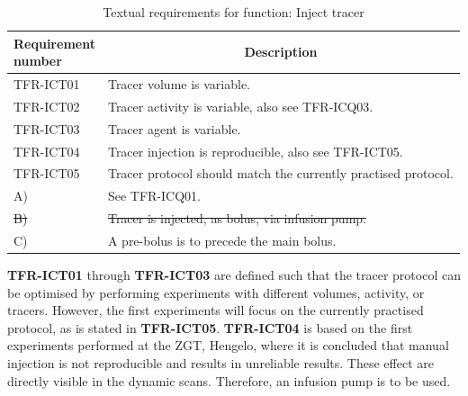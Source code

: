 \begin{table}[H]
\caption{Textual requirements for function: Inject tracer}
\label{tab:injtrac_text}
\begin{tabular}{l|p{115mm}|}
	\makecell[l]{\textbf{Requirement} \\  \textbf{number}} & \multicolumn{1}{c}{\textbf{Description}} \\
	\hline
	TFR-ICT01 			& Tracer volume is variable. \\
	TFR-ICT02			& Tracer activity is variable, also see TFR-ICQ03. \\
	TFR-ICT03			& Tracer agent is variable. \\
	TFR-ICT04 			& Tracer injection is reproducible, also see TFR-ICT05.\\
	TFR-ICT05 			& Tracer protocol should match the currently practised protocol. \\
	\hspace{1.5cm} A) 	& See TFR-ICQ01. \\
	\hspace{1.5cm} \sout{B)} 	& \sout{Tracer is injected, as bolus, via infusion pump.} \\
	\hspace{1.5cm} C) 	& A pre-bolus is to precede the main bolus. \\
	\cline{2-2}
\end{tabular}
\end{table}

\textbf{TFR-ICT01} through \textbf{TFR-ICT03} are defined such that the tracer protocol can be optimised by performing experiments with different volumes, activity, or tracers. However, the first experiments will focus on the currently practised protocol, as is stated in \textbf{TFR-ICT05}. \textbf{TFR-ICT04} is based on the first experiments performed at the ZGT, Hengelo, where it is concluded that manual injection is not reproducible and results in unreliable results. These effect are directly visible in the dynamic scans. Therefore, an infusion pump is to be used.

